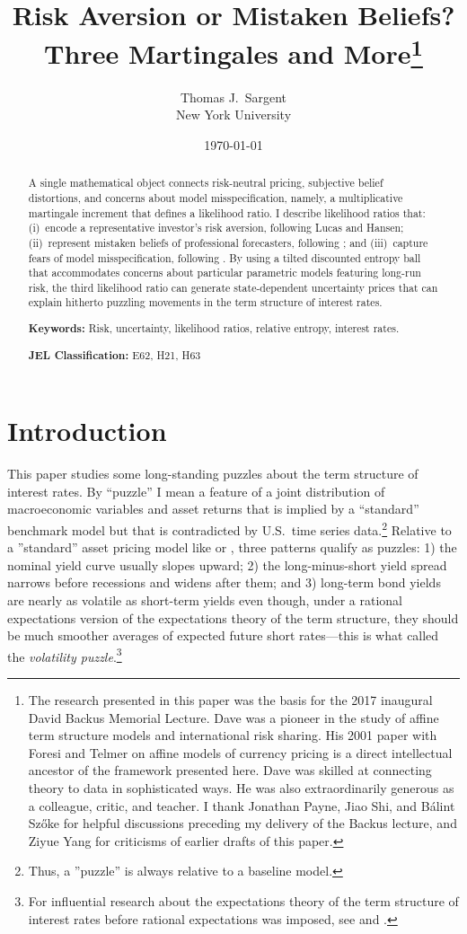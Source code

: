 \documentclass[12pt]{article}
\title{Risk Aversion or Mistaken Beliefs?\\[6pt]
\large Three Martingales and More\thanks{The research presented in this paper was  the basis for
the 2017 inaugural David Backus Memorial Lecture.
Dave was a pioneer in the study of affine term structure models and
international risk sharing.
His 2001 paper \citep{BFT2001} with Foresi and Telmer on affine models of currency
pricing is a direct intellectual ancestor of the framework presented
here.
Dave was skilled at connecting theory to data in sophisticated ways. He was also extraordinarily generous as a colleague,
critic, and teacher.
I thank Jonathan Payne, Jiao Shi, and B\'alint Sz\H{o}ke for helpful discussions preceding my delivery of the Backus lecture,
and Ziyue Yang for criticisms of earlier drafts of this paper.}}
\author{Thomas J.\ Sargent\\[4pt]
\small New York University}
\date{\today}
\theoremstyle{definition}
\begin{document}
\maketitle

\begin{abstract}
 A single  mathematical object connects
risk-neutral pricing, subjective belief distortions, and concerns about
model misspecification, namely, a multiplicative martingale increment that defines a likelihood ratio.
 I describe  likelihood ratios that:
(i)~encode a representative investor's risk aversion, following
Lucas and Hansen; (ii)~represent mistaken beliefs of professional
forecasters, following \citet{PSS2015}; and (iii)~capture fears of model misspecification, following
\citet{HSHS2020}.  By using  a tilted discounted entropy
ball that accommodates concerns about particular parametric models
featuring long-run risk, the third likelihood ratio can generate  state-dependent uncertainty
prices that can explain hitherto puzzling movements in the term structure of interest rates.

\medskip

\noindent \textbf{Keywords:} Risk, uncertainty, likelihood ratios, relative entropy, interest rates.

\medskip

\noindent \textbf{JEL Classification:} E62, H21, H63
\end{abstract}


\newpage

\section{Introduction}
\label{sec:intro}



This paper studies some    long-standing puzzles about the term structure of interest rates. By ``puzzle'' I mean a feature of a joint distribution of macroeconomic variables and asset returns that is  implied by a ``standard'' benchmark model but  that is contradicted by U.S.\ time series data.\footnote{Thus, a ''puzzle'' is always relative to a baseline model.}  Relative to a ''standard'' asset pricing model like \citet{Lucas1978} or \citet{cox1985theory}, three patterns qualify as puzzles: 1) the nominal yield curve usually slopes upward; 2) the long-minus-short yield spread narrows before recessions and widens after them; and 3) long-term bond yields are nearly as volatile as short-term yields even though, under a rational expectations version of the expectations theory of the term structure, they should be much smoother averages of expected future short rates---this is what \citet{Shiller1979} called the \emph{volatility puzzle}.\footnote{For influential research about the expectations theory of the term structure of interest rates before rational expectations was imposed, see \citet{bierwag1967model} and \citet{meiselman1961term}.}
\end{document}
